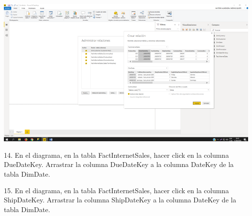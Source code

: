 \begin{center}
\includegraphics[width=15cm]{./Imagenes/img08} 
\end{center}

\item 14. En el diagrama, en la tabla FactInternetSales, hacer click en la columna DueDateKey. Arrastrar la columna DueDateKey a la columna DateKey de la tabla DimDate.

\item 15. En el diagrama, en la tabla FactInternetSales, hacer click en la columna ShipDateKey. Arrastrar la columna ShipDateKey a la columna DateKey de la tabla DimDate.

